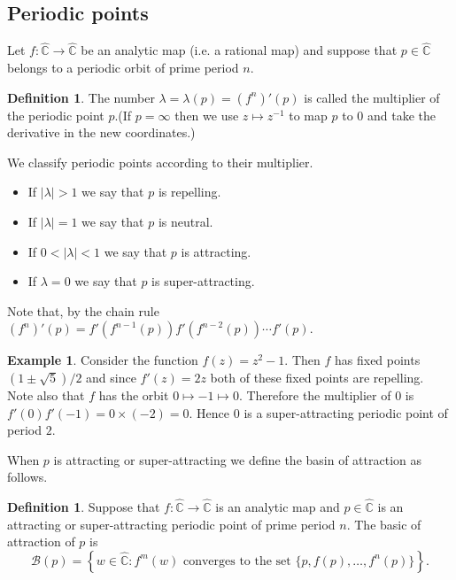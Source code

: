 \documentclass[12pt]{article}
\theoremstyle{definition}
\newtheorem{definition}[theorem]{Definition}
\newtheorem{example}[theorem]{Example}
\theoremstyle{remark}
\begin{document}
\subsection{Periodic points}

Let $f: \widehat{\mathbb{C}} \to \widehat{\mathbb{C}}$ be an analytic map (i.e. a rational map) and suppose that $p \in \widehat{\mathbb{C}}$ belongs to a periodic orbit of prime period $n$.

\begin{definition}
The number $\lambda=\lambda(p) =(f^n)'(p)$ is called the multiplier of the periodic point $p$.(If $p=\infty$ 
then we use $z \mapsto z^{-1}$ to map $p$ to $0$ and take the derivative in the new coordinates.)
\end{definition}

We classify periodic points according to their multiplier. 
\begin{itemize}
\item If $|\lambda| >1$ we say that $p$ is repelling.
\item If $|\lambda| = 1$ we say that $p$ is neutral.
\item If $0 < |\lambda| < 1$ we say that $p$ is attracting.
\item If $\lambda =0$ we say that $p$ is super-attracting.
\end{itemize}
Note that, by the chain rule $(f^n)'(p) = f'(f^{n-1}(p))f'(f^{n-2}(p)) \cdots f'(p)$.
\begin{example}
Consider the function $f(z) = z^2 - 1$. Then $f$ has fixed points $(1 \pm \sqrt{5})/2$ and since $f'(z) = 2z$ both of these fixed points are repelling. Note also that $f$ has the orbit $0 \mapsto -1 \mapsto 0$. Therefore the multiplier of $0$ is $f'(0) f'(-1) = 0 \times (-2) = 0$. Hence $0$ is a super-attracting periodic point of period $2$.
\end{example}

When $p$ is attracting or super-attracting we define the basin of attraction as follows.

\begin{definition}
Suppose that $f : \widehat{\mathbb{C}}  \to \widehat{\mathbb{C}} $ is an analytic map and $p \in \widehat{\mathbb{C}} $ is an attracting or super-attracting periodic point of prime period $n$. The basic of attraction of $p$ is
\[
\mathcal{B}(p) = \left\{ w\in \widehat{\mathbb{C}} : f^m(w) \text{ converges to the set } \{p, f(p), \ldots, f^n(p) \} \right\}.
\]
\end{definition}
\end{document}
